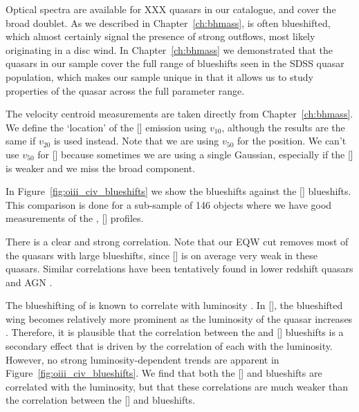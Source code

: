 Optical spectra are available for XXX quasars in our catalogue, and cover the broad  doublet. 
As we described in Chapter~\ref{ch:bhmass},  is often blueshifted, which almost certainly signal the presence of strong outflows, most likely originating in a disc wind.
In Chapter~\ref{ch:bhmass} we demonstrated that the quasars in our sample cover the full range of  blueshifts seen in the \ac{SDSS} quasar population, which makes our sample unique in that it allows us to study properties of the quasar across the full parameter range. 

The  velocity centroid measurements are taken directly from Chapter~\ref{ch:bhmass}. 
We define the `location' of the [] emission using $v_{10}$, although the results are the same if $v_{20}$ is used instead.
Note that we are using $v_{50}$ for the  position. 
We can't use $v_{50}$ for [] because sometimes we are using a single Gaussian, especially if the [] is weaker and we miss the broad component.

In Figure~\ref{fig:oiii_civ_blueshifts} we show the  blueshifts against the [] blueshifts.
This comparison is done for a sub-sample of 146 objects where we have good measurements of the , [] profiles. 

There is a clear and strong correlation. 
Note that our EQW cut removes most of the quasars with large  blueshifts, since [] is on average very weak in these quasars. 
Similar correlations have been tentatively found in lower redshift quasars and \ac{AGN} \citep{zamanov02}. 

The blueshifting of  is known to correlate with luminosity \citep{richards11}.
In [], the blueshifted wing becomes relatively more prominent as the luminosity of the quasar increases \citep{shen14}. 
Therefore, it is plausible that the correlation between the  and [] blueshifts is a secondary effect that is driven by the correlation of each with the luminosity. 
However, no strong luminosity-dependent trends are apparent in Figure~\ref{fig:oiii_civ_blueshifts}. 
We find that both the [] and  blueshifts are correlated with the luminosity, but that these correlations are much weaker than the correlation between the [] and  blueshifts. 



